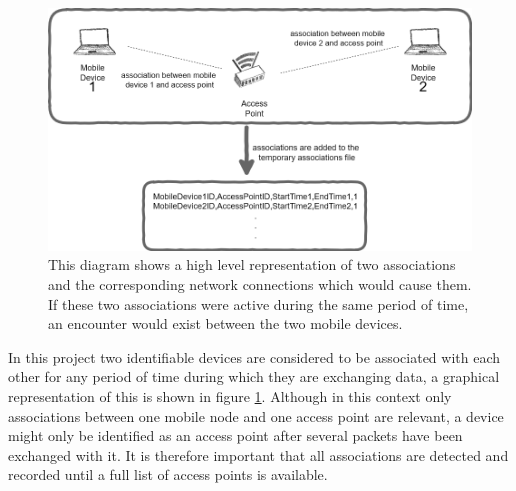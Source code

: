 \begin{figure}[h]
    \centerline{\includegraphics[width=1.2\textwidth]{hardware_to_assoc.png}}
    \caption{This diagram shows a high level representation of two associations and the corresponding network connections which would cause them. If these two associations were active during the same period of time, an encounter would exist between the two mobile devices.}
    \label{fig:high_level_dia}
\end{figure}
In this project two identifiable devices are considered to be associated with each other for any period of time during which they are exchanging data, a graphical representation of this is shown in figure \ref{fig:high_level_dia}. Although in this context only associations between one mobile node and one access point are relevant, a device might only be identified as an access point after several packets have been exchanged with it. It is therefore important that all associations are detected and recorded until a full list of access points is available.
